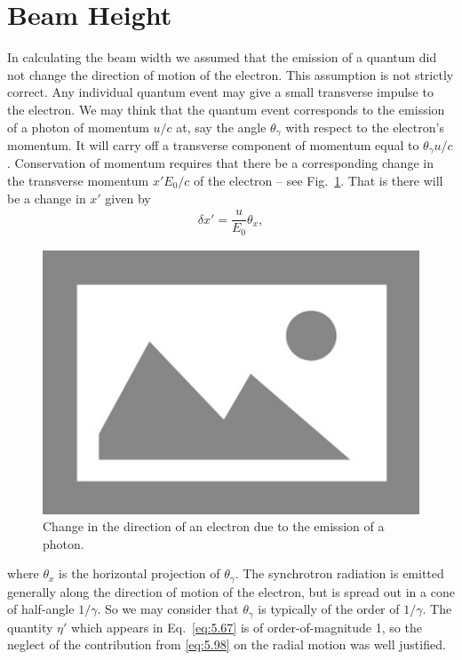 \section{Beam Height} \label{sec:5.6}

In calculating the beam width we assumed that the emission of a quantum did not change the direction of motion of the electron. This assumption is not strictly correct. Any individual
 quantum event may give a small transverse impulse to the electron. We may think that the quantum event corresponds to the emission of a photon of momentum $u/c$ at, say the angle $\theta_\gamma$ with respect to the electron's momentum. It will carry off a transverse component of momentum equal to $\theta_\gamma u/c$. Conservation of momentum requires that there be a corresponding
 change in the transverse momentum $x'E_0/c$ of the electron -- see Fig.~\ref{fig:fig45}. That is there will be a change in $x'$ given by
\begin{align} \label{eq:5.98}
	\delta x' = \dfrac{u}{E_0} \theta_{x},
\end{align}
\begin{figure}[!htb]
	\centering
	\includegraphics[width=0.8\linewidth]{./Figuras/placeholder.png}
	\caption{Change in the direction of an electron due to the emission of a photon.}
	\label{fig:fig45}
\end{figure}
where $\theta_x$ is the horizontal projection of $\theta_\gamma$. The synchrotron radiation
 is emitted generally along the direction of motion of the electron, but is spread out in a cone of half-angle $1/\gamma$. So we may consider that $\theta_\gamma$ is typically of the order of $1/\gamma$. The quantity $\eta'$ which appears in Eq.~\eqref{eq:5.67} is of order-of-magnitude
 1, so the neglect of the contribution from \eqref{eq:5.98} on the radial motion was well justified.\\
